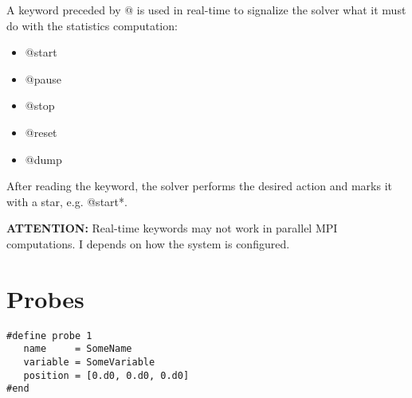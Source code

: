 \documentclass[a4paper,10pt]{report}
\begin{document}
A keyword preceded by @ is used in real-time to signalize the solver what it must do with the statistics computation:

\begin{multicols}{3}
\begin{itemize}
\item @start
\item @pause
\item @stop
\item @reset
\item @dump
\end{itemize}
\end{multicols}

After reading the keyword, the solver performs the desired action and marks it with a star, e.g. @start*.

\textbf{ATTENTION:} Real-time keywords may not work in parallel MPI computations. I depends on how the system is configured.


\section{Probes}

\begin{lstlisting}
#define probe 1
   name     = SomeName
   variable = SomeVariable
   position = [0.d0, 0.d0, 0.d0]
#end
\end{lstlisting}
\end{document}
